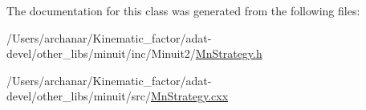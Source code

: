 The documentation for this class was generated from the following files\+:\begin{DoxyCompactItemize}
\item 
/\+Users/archanar/\+Kinematic\+\_\+factor/adat-\/devel/other\+\_\+libs/minuit/inc/\+Minuit2/\mbox{\hyperlink{adat-devel_2other__libs_2minuit_2inc_2Minuit2_2MnStrategy_8h}{Mn\+Strategy.\+h}}\item 
/\+Users/archanar/\+Kinematic\+\_\+factor/adat-\/devel/other\+\_\+libs/minuit/src/\mbox{\hyperlink{adat-devel_2other__libs_2minuit_2src_2MnStrategy_8cxx}{Mn\+Strategy.\+cxx}}\end{DoxyCompactItemize}
